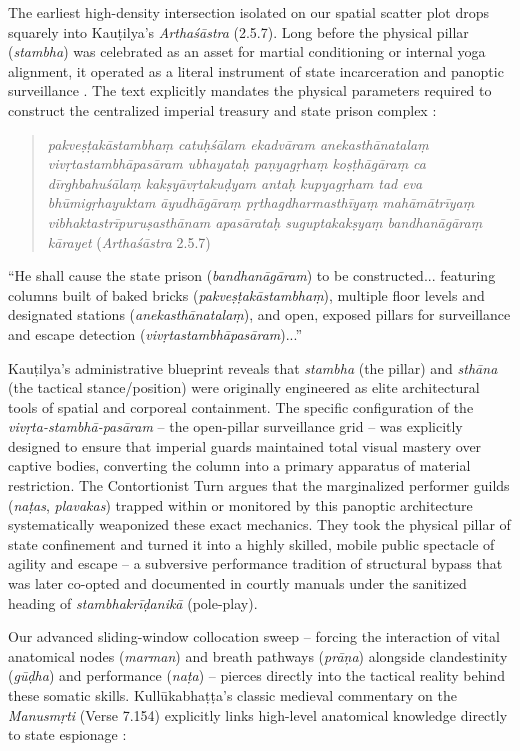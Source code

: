 \documentclass[11pt,twoside,letterpaper]{article}
\begin{document}
The earliest high-density intersection isolated on our spatial scatter plot drops squarely into Kauṭilya’s \textit{Arthaśāstra} (2.5.7). Long before the physical pillar (\textit{stambha}) was celebrated as an asset for martial conditioning or internal yoga alignment, it operated as a literal instrument of state incarceration and panoptic surveillance \citep{Kangle1969}. The text explicitly mandates the physical parameters required to construct the centralized imperial treasury and state prison complex \citep{Kangle1969}:
\begin{quote}
\textit{pakveṣṭakāstambhaṃ catuḥśālam ekadvāram anekasthānatalaṃ vivṛtastambhāpasāram ubhayataḥ paṇyagṛhaṃ koṣṭhāgāraṃ ca dīrghbahuśālaṃ kakṣyāvṛtakuḍyam antaḥ kupyagṛham tad eva bhūmigṛhayuktam āyudhāgāraṃ pṛthagdharmasthīyaṃ mahāmātrīyaṃ vibhaktastrīpuruṣasthānam apasārataḥ suguptakakṣyaṃ bandhanāgāraṃ kārayet} (\textit{Arthaśāstra} 2.5.7)
\end{quote}
``He shall cause the state prison (\textit{bandhanāgāram}) to be constructed... featuring columns built of baked bricks (\textit{pakveṣṭakāstambhaṃ}), multiple floor levels and designated stations (\textit{anekasthānatalaṃ}), and open, exposed pillars for surveillance and escape detection (\textit{vivṛtastambhāpasāram})...''

Kauṭilya’s administrative blueprint reveals that \textit{stambha} (the pillar) and \textit{sthāna} (the tactical stance/position) were originally engineered as elite architectural tools of spatial and corporeal containment. The specific configuration of the \textit{vivṛta-stambhā-pasāram} – the open-pillar surveillance grid – was explicitly designed to ensure that imperial guards maintained total visual mastery over captive bodies, converting the column into a primary apparatus of material restriction. The Contortionist Turn argues that the marginalized performer guilds (\textit{naṭas}, \textit{plavakas}) trapped within or monitored by this panoptic architecture systematically weaponized these exact mechanics. They took the physical pillar of state confinement and turned it into a highly skilled, mobile public spectacle of agility and escape – a subversive performance tradition of structural bypass that was later co-opted and documented in courtly manuals under the sanitized heading of \textit{stambhakrīḍanikā} (pole-play).

Our advanced sliding-window collocation sweep – forcing the interaction of vital anatomical nodes (\textit{marman}) and breath pathways (\textit{prāṇa}) alongside clandestinity (\textit{gūḍha}) and performance (\textit{naṭa}) – pierces directly into the tactical reality behind these somatic skills. Kullūkabhaṭṭa’s classic medieval commentary on the \textit{Manusmṛti} (Verse 7.154) explicitly links high-level anatomical knowledge directly to state espionage \citep{GRETIL_vcp}:
\end{document}
